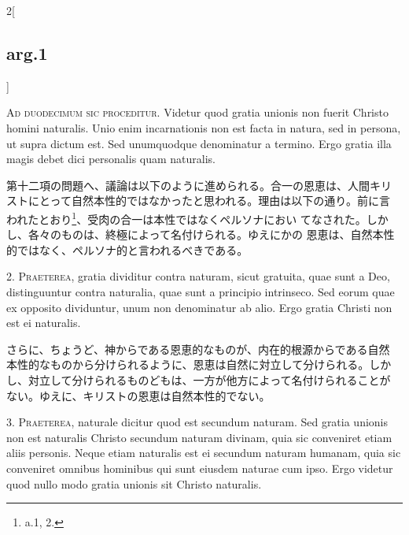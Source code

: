 \documentclass[paper=a4paper,fontsize=10pt,jafontsize=9pt,titlepage]{jlreq}
\begin{document}
\begin{paracol}{2}[\subsection{arg.1}]

{\Huge A}{\scshape d duodecimum sic proceditur}. Videtur quod gratia
unionis non fuerit Christo homini naturalis. Unio enim incarnationis
non est facta in natura, sed in persona, ut supra dictum est. Sed
unumquodque denominatur a termino. Ergo gratia illa magis debet dici
personalis quam naturalis.

\switchcolumn

第十二項の問題へ、議論は以下のように進められる。合一の恩恵は、人間キリ
ストにとって自然本性的ではなかったと思われる。理由は以下の通り。前に言
われたとおり\footnote{a.1, 2.}、受肉の合一は本性ではなくペルソナにおい
てなされた。しかし、各々のものは、終極によって名付けられる。ゆえにかの
恩恵は、自然本性的ではなく、ペルソナ的と言われるべきである。


2. {\scshape Praeterea}, gratia dividitur contra naturam, sicut
gratuita, quae sunt a Deo, distinguuntur contra naturalia, quae sunt a
principio intrinseco. Sed eorum quae ex opposito dividuntur, unum non
denominatur ab alio. Ergo gratia Christi non est ei naturalis.

\switchcolumn

さらに、ちょうど、神からである恩恵的なものが、内在的根源からである自然
本性的なものから分けられるように、恩恵は自然に対立して分けられる。しか
し、対立して分けられるものどもは、一方が他方によって名付けられることが
ない。ゆえに、キリストの恩恵は自然本性的でない。


3. {\scshape Praeterea}, naturale dicitur quod est secundum
naturam. Sed gratia unionis non est naturalis Christo secundum naturam
divinam, quia sic conveniret etiam aliis personis. Neque etiam
naturalis est ei secundum naturam humanam, quia sic conveniret omnibus
hominibus qui sunt eiusdem naturae cum ipso. Ergo videtur quod nullo
modo gratia unionis sit Christo naturalis.


\end{paracol}
\end{document}
